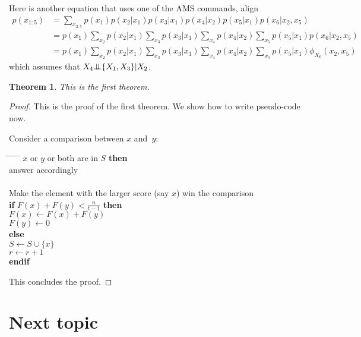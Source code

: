 \documentclass{article}
\newcounter{lecnum}
\newcommand{\indep}{{\bot\negthickspace\negthickspace\bot}}
\newtheorem{theorem}{Theorem}[lecnum]
\begin{document}
Here is another equation that uses one of the AMS commands, align
{\small 
\begin{align*}
p(x_{1:5}) & = 
\sum_{x_{2:5}} 
p(x_1)p(x_2|x_1)p(x_3|x_1)p(x_4|x_2)
p(x_5|x_1)p(x_6|x_2,x_5) \\
& =  
p(x_1)\sum_{x_2}p(x_2|x_1)\sum_{x_3}p(x_3|x_1)\sum_{x_4}p(x_4|x_2)
\sum_{x_5}p(x_5|x_1)p(x_6|x_2,x_5) \\
& =  
p(x_1)\sum_{x_2}p(x_2|x_1)\sum_{x_3}p(x_3|x_1)\sum_{x_4}p(x_4|x_2)
\sum_{x_5}p(x_5|x_1)\phi_{X_6}(x_2,x_5)
\end{align*}
}
which assumes that $X_4 \indep \{ X_1, X_3 \} | X_2$.

\begin{theorem}
This is the first theorem.
\end{theorem}

\begin{proof}
This is the proof of the first theorem. We show how to write pseudo-code now.

Consider a comparison between $x$ and~$y$:
\begin{tabbing}
\hspace*{.25in} \= \hspace*{.25in} \= \hspace*{.25in} \= \hspace*{.25in} \= \hspace*{.25in} \=\kill
{} $x$ or $y$ or both are in $S$ {\bf then } \\
\>\> answer accordingly \\
 \\
\>\>    Make the element with the larger score (say $x$) win the comparison \\
\>\> {\bf if} $F(x) + F(y) < \frac{n}{t-1}$ {\bf then} \\%
\>\>\> $F(x) \leftarrow F(x) + F(y)$ \\
\>\>\> $F(y) \leftarrow 0$ \\
\>\> {\bf else}  \\
\>\>\> $S \leftarrow S \cup \{ x \} $ \\
\>\>\> $r \leftarrow r+1$ \\
\>\> {\bf endif} \\
\end{tabbing}

This concludes the proof.
\end{proof}

\section{Next topic}
\end{document}
